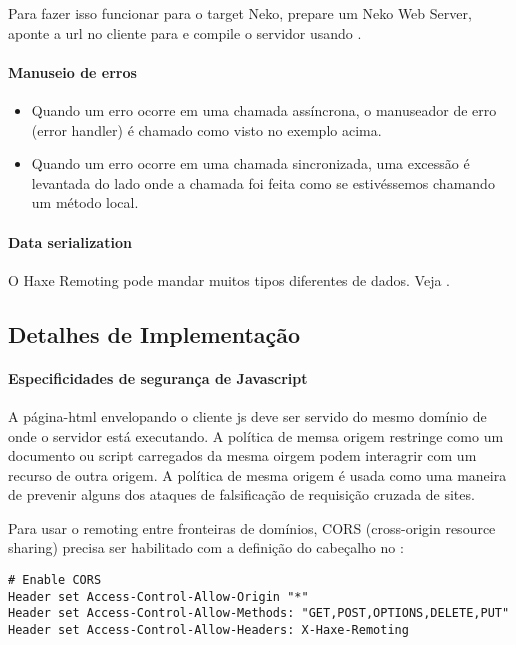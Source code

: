 {Para fazer isso funcionar para o target Neko, prepare um Neko Web Server, aponte a url no cliente para  e compile o servidor usando .

\paragraph{Manuseio de erros}

\begin{itemize}
    \item Quando um erro ocorre em uma chamada assíncrona, o manuseador de erro (error handler) é chamado como visto no exemplo acima.
	\item Quando um erro ocorre em uma chamada sincronizada, uma excessão é levantada do lado onde a chamada foi feita como se estivéssemos chamando um método local. 
\end{itemize}

\paragraph{Data serialization}

O Haxe Remoting pode mandar muitos tipos diferentes de dados. Veja .

\subsection{Detalhes de Implementação}
\label{std-remoting-implementation-details}

\paragraph{Especificidades de segurança de Javascript}

A página-html envelopando o cliente js deve ser servido do mesmo domínio de onde o servidor está executando. A política de memsa origem restringe como um documento ou script carregados da mesma oirgem podem interagrir com um recurso de outra origem. A política de mesma origem é usada como uma maneira de prevenir alguns dos ataques de falsificação de requisição cruzada de sites.

Para usar o remoting entre fronteiras de domínios, CORS (cross-origin resource sharing) precisa ser habilitado com a definição do cabeçalho  no :

\begin{lstlisting} 
# Enable CORS
Header set Access-Control-Allow-Origin "*"
Header set Access-Control-Allow-Methods: "GET,POST,OPTIONS,DELETE,PUT"
Header set Access-Control-Allow-Headers: X-Haxe-Remoting
\end{lstlisting} 

}
